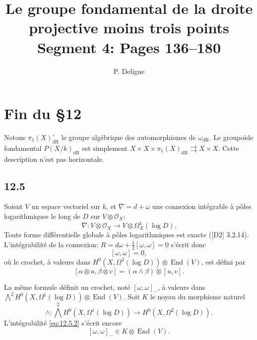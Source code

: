 \documentclass[12pt,a4paper]{article}
\title{Le groupe fondamental de la droite projective moins trois points\\
\Large Segment 4: Pages 136--180}
\author{P. Deligne}
\date{}
\theoremstyle{plain}
\theoremstyle{definition}
\theoremstyle{remark}
\DeclareMathOperator{\End}{End}
\newcommand{\cO}{\mathcal{O}}
\newcommand{\dr}{\mathrm{dR}}
\begin{document}
\maketitle

\tableofcontents
\newpage

\section*{Fin du §12}

Notons $\pi_1(X)_{\dr}^\circ$ le groupe algébrique des automorphismes de $\omega_{\dr}$. Le groupoïde fondamental $P(X/k)_{\dr}$ est simplement $X \times X \times \pi_1(X)_{\dr} \rightrightarrows X \times X$. Cette description n'est pas horizontale.

\subsection*{12.5}

Soient $V$ un espace vectoriel sur $k$, et $\nabla = d + \omega$ une connexion intégrable à pôles logarithmiques le long de $D$ sur $V \otimes \cO_X$:
\begin{equation}\label{eq:12.5.1}
\nabla : V \otimes \cO_X \to V \otimes \Omega_X^1(\log D).
\end{equation}
Toute forme différentielle globale à pôles logarithmiques est exacte ([D2] 3.2.14). L'intégrabilité de la connexion: $R = d\omega + \frac{1}{2}[\omega,\omega] = 0$ s'écrit donc
\begin{equation}\label{eq:12.5.2}
[\omega, \omega] = 0,
\end{equation}
où le crochet, à valeurs dans $H^0(X, \Omega^2(\log D)) \otimes \End(V)$, est défini par
\[
[\alpha \otimes u, \beta \otimes v] = (\alpha \wedge \beta) \otimes [u,v].
\]

La même formule définit un crochet, noté $[\omega, \omega]_-$, à valeurs dans $\bigwedge^2 H^0(X, \Omega^1(\log D)) \otimes \End(V)$. Soit $K$ le noyau du morphisme naturel
\[
\wedge : \bigwedge^2 H^0(X, \Omega^1(\log D)) \to H^0(X, \Omega^2(\log D)).
\]
L'intégrabilité \eqref{eq:12.5.2} s'écrit encore
\begin{equation}\label{eq:12.5.3}
[\omega, \omega]_- \in K \otimes \End(V).
\end{equation}
\end{document}

